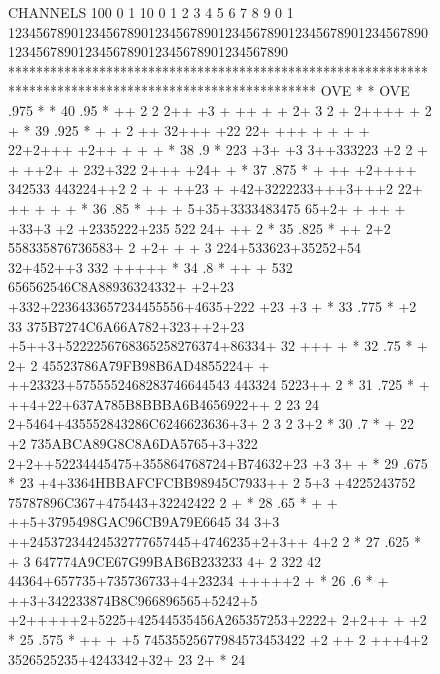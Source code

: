 \begin{figure}[p]
\begin{XMPfrac}{3.3}
CHANNELS 100 0                                                                                                  1
          10 0        1         2         3         4         5         6         7         8         9         0
           1 1234567890123456789012345678901234567890123456789012345678901234567890123456789012345678901234567890
           ********************************************************************************************************
  OVE      *                                                                                                      * OVE
     .975  *                                                                                                      *  40
     .95   *                  ++   2   2 2++  +3 +   ++     +  +     2+         3 2  + 2++++       + 2    +       *  39
     .925  *           +   +    2  ++ 32+++ +22  22+    +++    +       + +    +  22+2+++ +2++   + + +             *  38
     .9    *                   223 +3+ +3 3++333223  +2  2     +  +    ++2+ +    232+322 2+++  +24+      +        *  37
     .875  *           +   ++ +2++++ 342533 443224++2 2  +   +  ++23  +  +42+3222233+++3+++2 22+ ++   + + +       *  36
     .85   *               ++  + 5+35+3333483475 65+2+ + ++  +    +33+3 +2 +2335222+235 522 24+   ++    2         *  35
     .825  *                ++  2+2 558335876736583+ 2 +2+ + +   3   224+533623+35252+54 32+452++3 332 +++++      *  34
     .8    *            ++   + 532 656562546C8A88936324332+ +2+23 +332+2236433657234455556+4635+222 +23 +3  +     *  33
     .775  *               +2  33 375B7274C6A66A782+323++2+23  +5++3+5222256768365258276374+86334+ 32    +++ +    *  32
     .75   *            + 2+ 2 45523786A79FB98B6AD4855224+  + ++23323+5755552468283746644543 443324 5223++  2     *  31
     .725  *            + ++4+22+637A785B8BBBA6B4656922++ 2 23 24 2+5464+435552843286C6246623636+3+ 2 3 2  3+2    *  30
     .7    *       +      22 +2 735ABCA89G8C8A6DA5765+3+322  2+2++52234445475+355864768724+B74632+23 +3   3+   +  *  29
     .675  *              23 +4+3364HBBAFCFCBB98945C7933++ 2 5+3 +4225243752 75787896C367+475443+32242422 2 +     *  28
     .65   *           + + ++5+3795498GAC96CB9A79E6645 34 3+3  ++24537234424532777657445+4746235+2+3++  4+2 2     *  27
     .625  *           +     3 647774A9CE67G99BAB6B233233 4+ 2 322 42 44364+657735+735736733+4+23234 +++++2  +    *  26
     .6    *            + ++3+342233874B8C966896565+5242+5 +2+++++2+5225+42544535456A265357253+2222+ 2+2++ +  +2  *  25
     .575  *           ++  +  +5 74535525677984573453422 +2   ++ 2  +++4+2 3526525235+4243342+32+  23 2+          *  24

\end{XMPfrac}
\end{figure}
